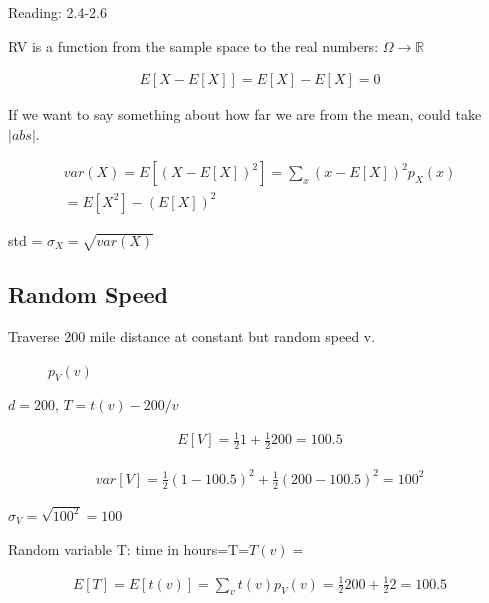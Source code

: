 
 Reading: 2.4-2.6

RV is a function from the sample space to the real numbers: $\Omega \rightarrow \mathbb{R}$


\begin{align*}
E[X-E[X]] = E[X] - E[X] = 0
\end{align*}

If we want to say something about how far we are from the mean, could take $|abs|$.

\begin{align*}
var(X)=E[(X-E[X])^2] = \sum_x(x - E[X])^2 p_X(x)\\
= E[X^2] -(E[X])^2
\end{align*}

std = $\sigma_X = \sqrt{var(X)}$

\subsection{Random Speed}


Traverse 200 mile distance at constant but random speed v.


\begin{figure}[h]
\caption{$p_V(v)$}
\end{figure}

$d=200$, $T=t(v)-200/v$

\begin{align*}
E[V] = \frac{1}{2}1 + \frac{1}{2}200 = 100.5
\end{align*}

\begin{align*}
var[V] = \frac{1}{2}(1-100.5)^2 + \frac{1}{2}(200 -100.5)^2 = 100^2
\end{align*}

$\sigma_V = \sqrt{100^2}=100$


Random variable T: time in hours=T=$T(v)=$

\begin{align*}
E[T] = E[t(v)] = \sum_v t(v)p_V(v) = \frac{1}{2}200 + \frac{1}{2}2 = 100.5
\end{align*}

